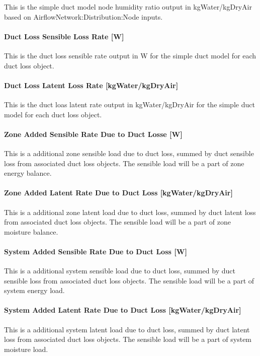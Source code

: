 This is the simple duct model node humidity ratio output in kgWater/kgDryAir based on AirflowNetwork:Distribution:Node inputs.

\paragraph{Duct Loss Sensible Loss Rate {[}W{]}}\label{duct-loss-sensible-rate-w}

This is the duct loss sensible rate output in W for the simple duct model for each duct loss object.

\paragraph{Duct Loss Latent Loss Rate {[}kgWater/kgDryAir{]}}\label{duct-loss-latent-rate-kgwaterkgdryair}

This is the duct loas latent rate output in kgWater/kgDryAir for the simple duct model for each duct loss object.

\paragraph{Zone Added Sensible Rate Due to Duct Losse {[}W{]}}\label{zone-added-sensible-rate-to-duct-loss-w}

This is a additional zone sensible load due to duct loss, summed by duct sensible loss from associated duct loss objects. The sensible load will be a part of zone energy balance.

\paragraph{Zone Added Latent Rate Due to Duct Loss {[}kgWater/kgDryAir{]}}\label{zone-added-latent-rate-to-duct-loss-kgwaterkgdryair}

This is a additional zone latent load due to duct loss, summed by duct latent loss from associated duct loss objects. The sensible load will be a part of zone moisture balance.

\paragraph{System Added Sensible Rate Due to Duct Loss {[}W{]}}\label{system-added-sensible-rate-to-duct-loss-w}

This is a additional system sensible load due to duct loss, summed by duct sensible loss from associated duct loss objects. The sensible load will be a part of system energy load.

\paragraph{System Added Latent Rate Due to Duct Loss {[}kgWater/kgDryAir{]}}\label{system-added-latent-rate-to-duct-loss-w-kgwaterkgdryair}

This is a additional system latent load due to duct loss, summed by duct latent loss from associated duct loss objects. The sensible load will be a part of system moisture load.

